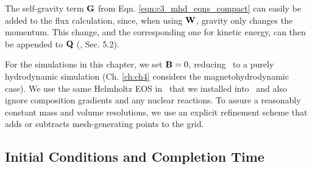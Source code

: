 
The self-gravity term ${\bf G}$ from Eqn. \ref{eqn:c3_mhd_eqns_compact} can easily be added to the flux calculation, since, when using ${\bf W}$, gravity only changes the momentum.  This change, and the corresponding one for kinetic energy, can then be appended to ${\bf Q}$ (\citealt{spri10}, Sec. 5.2).  


For the simulations in this chapter, we set ${\bf B} = 0$, reducing \arepo\ to a purely hydrodynamic simulation (Ch. \ref{ch:ch4} considers the magnetohydrodynamic case).  We use the same Helmholtz EOS in \arepo\ that we installed into \gasoline\ and also ignore composition gradients and any nuclear reactions.  To assure a reasonably constant mass and volume resolutions, we use an explicit refinement scheme \citep{voge+12} that adds or subtracts mesh-generating points to the grid.  


\subsection{Initial Conditions and Completion Time}
\label{ssec:c3_initcond}

